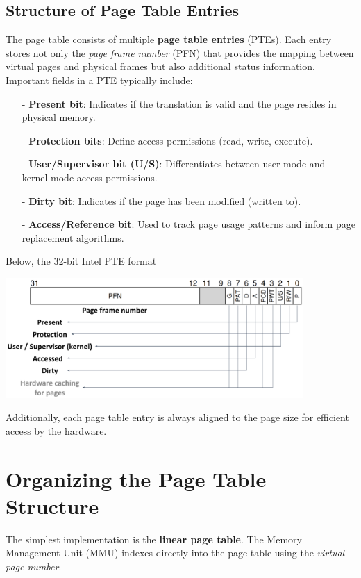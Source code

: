 \subsection{Structure of Page Table Entries}
The page table consists of multiple \textbf{page table entries} (PTEs). Each entry stores not only the \textit{page frame number} (PFN) that provides the mapping between virtual pages and physical frames but also additional status information. Important fields in a PTE typically include:

\begin{itemize}
  \item[-] \textbf{Present bit}: Indicates if the translation is valid and the page resides in physical memory.
  \item[-] \textbf{Protection bits}: Define access permissions (read, write, execute).
  \item[-] \textbf{User/Supervisor bit (U/S)}: Differentiates between user-mode and kernel-mode access permissions.
  \item[-] \textbf{Dirty bit}: Indicates if the page has been modified (written to).
  \item[-] \textbf{Access/Reference bit}: Used to track page usage patterns and inform page replacement algorithms.
\end{itemize}
\newpage
Below, the 32-bit Intel PTE format
\begin{center}
  \includegraphics[width=0.85\textwidth]{chapters/L5/images/intel.png}
\end{center}

Additionally, each page table entry is always aligned to the page size for efficient access by the hardware.


\section{Organizing the Page Table Structure}

The simplest implementation is the \textbf{linear page table}. The Memory Management Unit (MMU) indexes directly into the page table using the \emph{virtual page number}.

